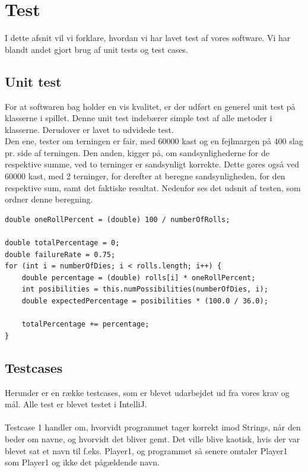 \chapter{Test}

I dette afsnit vil vi forklare, hvordan vi har lavet test af vores software.
Vi har blandt andet gjort brug af unit tests og test cases.

\section{Unit test}

For at softwaren bag holder en vis kvalitet, er der udført en generel unit test på klasserne i spillet.
Denne unit test indebærer simple test af alle metoder i klasserne.
Derudover er lavet to udvidede test.
\\
Den ene, tester om terningen er fair, med 60000 kast og en fejlmargen på 400 slag pr. side af terningen.
Den anden, kigger på, om sandsynlighederne for de respektive summe, ved to terninger er sandsynligt korrekte.
Dette gøres også ved 60000 kast, med 2 terninger, for derefter at beregne sandsynligheden, for den respektive sum, samt det faktiske resultat.
Nedenfor ses det udsnit af testen, som ordner denne beregning.
\\

\begin{lstlisting}
double oneRollPercent = (double) 100 / numberOfRolls;
    
double totalPercentage = 0;
double failureRate = 0.75;
for (int i = numberOfDies; i < rolls.length; i++) {
    double percentage = (double) rolls[i] * oneRollPercent;
    int posibilities = this.numPossibilities(numberOfDies, i);
    double expectedPercentage = posibilities * (100.0 / 36.0);

    totalPercentage += percentage;
}
\end{lstlisting}
\newpage
\section{Testcases}
Herunder er en række testcases, som er blevet udarbejdet ud fra vores krav og mål.
Alle test er blevet testet i IntelliJ.
\\\\Testcase 1 handler om, hvorvidt programmet tager korrekt imod Strings, når den beder om navne, og hvorvidt det bliver gemt.
Det ville blive kaotisk, hvis der var blevet sat et navn til f.eks. Player1, og programmet så senere omtaler Player1 som Player1 og ikke det pågældende navn.

